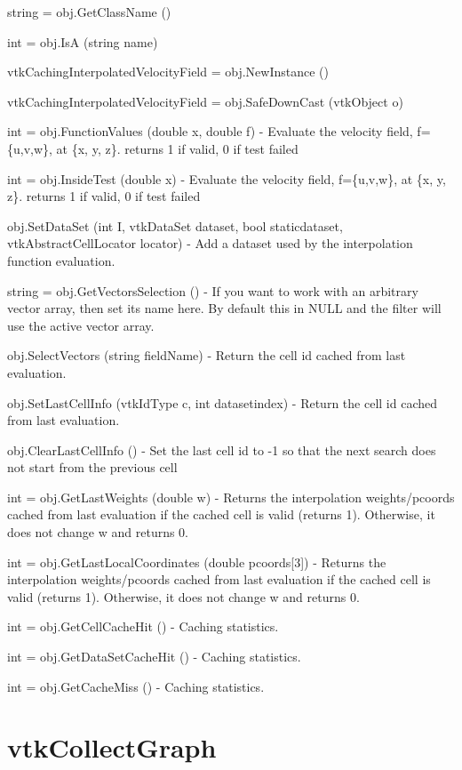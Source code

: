 \begin{DoxyItemize}
\item {\ttfamily string = obj.\-Get\-Class\-Name ()}  
\item {\ttfamily int = obj.\-Is\-A (string name)}  
\item {\ttfamily vtk\-Caching\-Interpolated\-Velocity\-Field = obj.\-New\-Instance ()}  
\item {\ttfamily vtk\-Caching\-Interpolated\-Velocity\-Field = obj.\-Safe\-Down\-Cast (vtk\-Object o)}  
\item {\ttfamily int = obj.\-Function\-Values (double x, double f)} -\/ Evaluate the velocity field, f=\{u,v,w\}, at \{x, y, z\}. returns 1 if valid, 0 if test failed  
\item {\ttfamily int = obj.\-Inside\-Test (double x)} -\/ Evaluate the velocity field, f=\{u,v,w\}, at \{x, y, z\}. returns 1 if valid, 0 if test failed  
\item {\ttfamily obj.\-Set\-Data\-Set (int I, vtk\-Data\-Set dataset, bool staticdataset, vtk\-Abstract\-Cell\-Locator locator)} -\/ Add a dataset used by the interpolation function evaluation.  
\item {\ttfamily string = obj.\-Get\-Vectors\-Selection ()} -\/ If you want to work with an arbitrary vector array, then set its name here. By default this in N\-U\-L\-L and the filter will use the active vector array.  
\item {\ttfamily obj.\-Select\-Vectors (string field\-Name)} -\/ Return the cell id cached from last evaluation.  
\item {\ttfamily obj.\-Set\-Last\-Cell\-Info (vtk\-Id\-Type c, int datasetindex)} -\/ Return the cell id cached from last evaluation.  
\item {\ttfamily obj.\-Clear\-Last\-Cell\-Info ()} -\/ Set the last cell id to -\/1 so that the next search does not start from the previous cell  
\item {\ttfamily int = obj.\-Get\-Last\-Weights (double w)} -\/ Returns the interpolation weights/pcoords cached from last evaluation if the cached cell is valid (returns 1). Otherwise, it does not change w and returns 0.  
\item {\ttfamily int = obj.\-Get\-Last\-Local\-Coordinates (double pcoords\mbox{[}3\mbox{]})} -\/ Returns the interpolation weights/pcoords cached from last evaluation if the cached cell is valid (returns 1). Otherwise, it does not change w and returns 0.  
\item {\ttfamily int = obj.\-Get\-Cell\-Cache\-Hit ()} -\/ Caching statistics.  
\item {\ttfamily int = obj.\-Get\-Data\-Set\-Cache\-Hit ()} -\/ Caching statistics.  
\item {\ttfamily int = obj.\-Get\-Cache\-Miss ()} -\/ Caching statistics.  
\end{DoxyItemize}\hypertarget{vtkparallel_vtkcollectgraph}{}\section{vtk\-Collect\-Graph}\label{vtkparallel_vtkcollectgraph}
